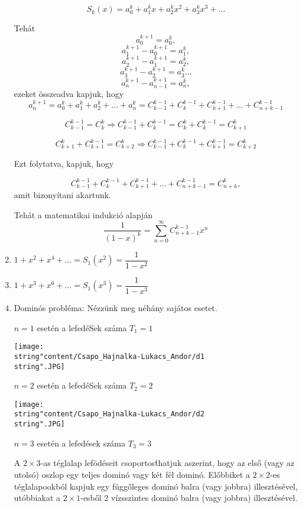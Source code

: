 \begin{solution}
\begin{enumerate}
\[
S_{k}(x)=a_{0}^{k}+a_{1}^{k}x+a_{2}^{k}x^{2}+a_{3}^{k}x^{3}+\dots
\]

Tehát 
\[
a_{0}^{k+1}=a_{0}^{k},
\]
\[
a_{1}^{k+1}-a_{0}^{k+1}=a_{1}^{k},
\]
\[
a_{2}^{k+1}-a_{1}^{k+1}=a_{2}^{k},
\]
\[
a_{3}^{k+1}-a_{2}^{k+1}=a_{3}^{k}\dots
\]
\[
a_{n}^{k+1}-a_{n-1}^{k+1}=a_{n}^{k},
\]
ezeket összeadva kapjuk, hogy 
\[
a_{n}^{k+1}=a_{0}^{k}+a_{1}^{k}+a_{2}^{k}+\dots+a_{n}^{k}=C_{k-1}^{k-1}+C_{k}^{k-1}+C_{k+1}^{k-1}+\dots+C_{n+k-1}^{k-1}
\]

\[
C_{k-1}^{k-1}=C_{k}^{k}\Rightarrow C_{k-1}^{k-1}+C_{k}^{k-1}=C_{k}^{k}+C_{k}^{k-1}=C_{k+1}^{k}
\]

\[
C_{k+1}^{k}+C_{k+1}^{k-1}=C_{k+2}^{k}\Rightarrow C_{k-1}^{k-1}+C_{k}^{k-1}+C_{k+1}^{k-1}=C_{k+2}^{k}
\]

Ezt folytatva, kapjuk, hogy

\[
C_{k-1}^{k-1}+C_{k}^{k-1}+C_{k+1}^{k-1}+\dots+C_{n+k-1}^{k-1}=C_{n+k}^{k},
\]
amit bizonyítani akartunk.

Tehát a matematikai indukció alapján 
\[
\dfrac{1}{(1-x)^{k}}=\sum_{n=0}^{\infty}C_{n+k-1}^{k-1}x^{n}
\]

\item $1+x^{2}+x^{4}+\dots=S_{1}(x^{2})=\dfrac{1}{1-x^{2}}$ 
\item $1+x^{3}+x^{6}+\dots=S_{1}(x^{3})=\dfrac{1}{1-x^{3}}$ %
\item Dominós probléma: Nézzünk meg néhány sajátos esetet.

$n=1$ esetén a lefedéSek száma $T_{1}=1$

\texttt{[image: \\string"content/Csapo\_Hajnalka-Lukacs\_Andor/d1\\string".JPG]}

$n=2$ esetén a lefedéSek száma $T_{2}=2$

\texttt{[image: \\string"content/Csapo\_Hajnalka-Lukacs\_Andor/d2\\string".JPG]}

$n=3$ esetén a lefedések száma $T_{3}=3$

A $2\times3$-as téglalap lefödéseit csoportos\'{t}hatjuk aszerint,
hogy az első (vagy az utolsó) oszlop egy teljes dominó vagy két fél
dominó. Előbbiket a $2\times2$-es téglalapookból kapjuk egy függőleges
dominó balra (vagy jobbra) illesztésével, utóbbiakat a $2\times1$-esből
2 vízsszintes dominó balra (vagy jobbra) illesztésével.


\end{enumerate}
\end{solution}
